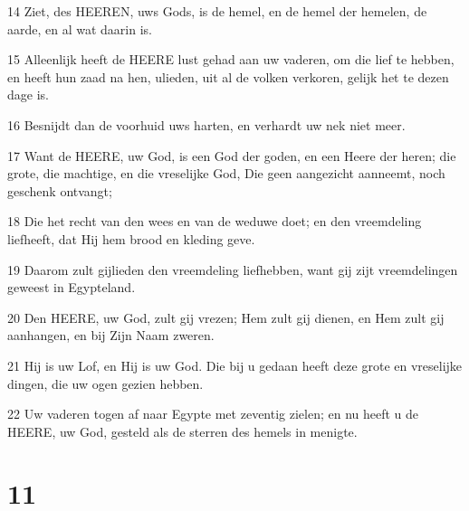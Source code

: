 \par 14 Ziet, des HEEREN, uws Gods, is de hemel, en de hemel der hemelen, de aarde, en al wat daarin is.
\par 15 Alleenlijk heeft de HEERE lust gehad aan uw vaderen, om die lief te hebben, en heeft hun zaad na hen, ulieden, uit al de volken verkoren, gelijk het te dezen dage is.
\par 16 Besnijdt dan de voorhuid uws harten, en verhardt uw nek niet meer.
\par 17 Want de HEERE, uw God, is een God der goden, en een Heere der heren; die grote, die machtige, en die vreselijke God, Die geen aangezicht aanneemt, noch geschenk ontvangt;
\par 18 Die het recht van den wees en van de weduwe doet; en den vreemdeling liefheeft, dat Hij hem brood en kleding geve.
\par 19 Daarom zult gijlieden den vreemdeling liefhebben, want gij zijt vreemdelingen geweest in Egypteland.
\par 20 Den HEERE, uw God, zult gij vrezen; Hem zult gij dienen, en Hem zult gij aanhangen, en bij Zijn Naam zweren.
\par 21 Hij is uw Lof, en Hij is uw God. Die bij u gedaan heeft deze grote en vreselijke dingen, die uw ogen gezien hebben.
\par 22 Uw vaderen togen af naar Egypte met zeventig zielen; en nu heeft u de HEERE, uw God, gesteld als de sterren des hemels in menigte.

\chapter{11}

